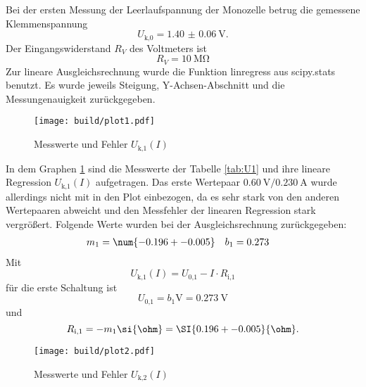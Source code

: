   Bei der ersten Messung der Leerlaufspannung der Monozelle betrug die
  gemessene Klemmenspannung
  \begin{equation}
    U_\text{k,0} = \SI{1.40(6)}{\V}.
  \end{equation}
  Der Eingangswiderstand $R_V$ des Voltmeters ist
  \begin{equation}
    R_V = \SI{10}{\mega\ohm}
  \end{equation}
  Zur lineare Ausgleichsrechnung wurde die Funktion linregress aus scipy.stats
  benutzt. Es wurde jeweils Steigung, Y-Achsen-Abschnitt und die
  Messungenauigkeit zurückgegeben.

  \newpage

  \begin{figure}[h]
    \texttt{[image: build/plot1.pdf]}
    \caption{Messwerte und Fehler $U_\text{k,1}(I)$}
    \label{fig:U1}
  \end{figure}

  In dem Graphen \ref{fig:U1} sind die Messwerte der Tabelle
  \ref{tab:U1} und ihre lineare Regression
  $U_\text{k,1}(I)$ aufgetragen.
  Das erste Wertepaar $\SI{0.60}{\V}/ \SI{0.230}{\A}$
  wurde allerdings nicht mit in den Plot einbezogen,
  da es sehr stark von den anderen Wertepaaren abweicht und
  den Messfehler der linearen Regression stark vergrößert.
  Folgende Werte wurden bei der Ausgleichsrechnung zurückgegeben:
  \begin{align}
    m_1 & = \num{-0.196 +- 0.005} & b_1 & = 0.273
  \end{align}
  Mit
  \begin{equation}
    U_\text{k,1}(I) = U_\text{0,1} - I \cdot R_\text{i,1}
  \end{equation}
  für die erste Schaltung ist
  \begin{equation}
    U_\text{0,1} = b_1 \si{\V} = \SI{0.273}{\V}
  \end{equation}
  und
  \begin{equation}
    R_\text{i,1} = -m_1 \si{\ohm} = \SI{0.196 +- 0.005}{\ohm}.
  \end{equation}

  \newpage

  \begin{figure}[h]
    \texttt{[image: build/plot2.pdf]}
    \caption{Messwerte und Fehler $U_\text{k,2}(I)$}
    \label{fig:U2}
  \end{figure}

